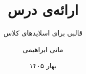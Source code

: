 
\title{ارائه‌ی درس}
\subtitle{قالبی برای اسلایدهای کلاس}
\author{مانی ابراهیمی}
\date{بهار ۱۴۰۵}

\def\deckLogo{images/logo.png}
